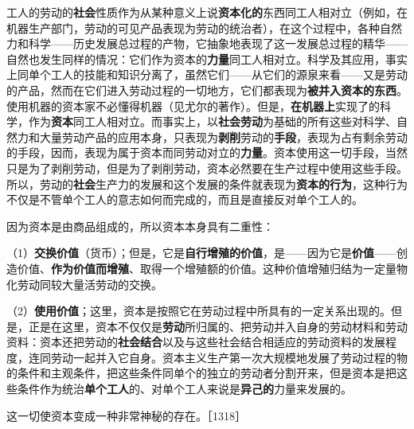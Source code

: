 工人的劳动的\textbf{社会}性质作为从某种意义上说\textbf{资本化的}东西同工人相对立（例如，在机器生产部门，劳动的可见产品表现为劳动的统治者），在这个过程中，各种自然力和科学——历史发展总过程的产物，它抽象地表现了这一发展总过程的精华——自然也发生同样的情况：它们作为资本的\textbf{力量}同工人相对立。科学及其应用，事实上同单个工人的技能和知识分离了，虽然它们——从它们的源泉来看——又是劳动的产品，然而在它们进入劳动过程的一切地方，它们都表现为\textbf{被并入资本的东西}。使用机器的资本家不必懂得机器（见尤尔的著作）。但是，\textbf{在机器上}实现了的科学，作为\textbf{资本}同工人相对立。而事实上，以\textbf{社会劳动}为基础的所有这些对科学、自然力和大量劳动产品的应用本身，只表现为\textbf{剥削}劳动的\textbf{手段}，表现为占有剩余劳动的手段，因而，表现为属于资本而同劳动对立的\textbf{力量}。资本使用这一切手段，当然只是为了剥削劳动，但是为了剥削劳动，资本必然要在生产过程中使用这些手段。所以，劳动的\textbf{社会}生产力的发展和这个发展的条件就表现为\textbf{资本的行为}，这种行为不仅是不管单个工人的意志如何而完成的，而且是直接反对单个工人的。

因为资本是由商品组成的，所以资本本身具有二重性：

（1）\textbf{交换价值}（货币）；但是，它是\textbf{自行增殖的价值}，是——因为它是\textbf{价值}——创造价值、\textbf{作为价值而增殖}、取得一个增殖额的价值。这种价值增殖归结为一定量物化劳动同较大量活劳动的交换。

（2）\textbf{使用价值}；这里，资本是按照它在劳动过程中所具有的一定关系出现的。但是，正是在这里，资本不仅仅是\textbf{劳动}所归属的、把劳动并入自身的劳动材料和劳动资料：资本还把劳动的\textbf{社会结合}以及与这些社会结合相适应的劳动资料的发展程度，连同劳动一起并入它自身。资本主义生产第一次大规模地发展了劳动过程的物的条件和主观条件，把这些条件同单个的独立的劳动者分割开来，但是资本是把这些条件作为统治\textbf{单个工人}的、对单个工人来说是\textbf{异己的}力量来发展的。

这一切使资本变成一种非常神秘的存在。［1318］

